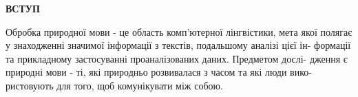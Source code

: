\thispagestyle{empty}

\begin{center}
\textbf{\Large ВСТУП}
\end{center}

Обробка природної мови - це область комп’ютерної лінгвістики, мета якої
полягає у знаходженні значимої інформації з текстів, подальшому аналізі цієї ін-
формації та прикладному застосуванні проаналізованих даних. Предметом дослі-
дження є природні мови - ті, які природньо розвивалася з часом та які люди вико-
ристовують для того, щоб комунікувати між собою.